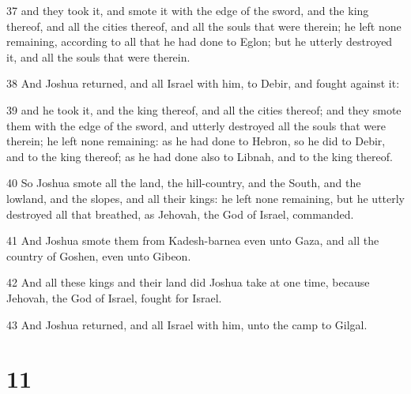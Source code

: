 \par 37 and they took it, and smote it with the edge of the sword, and the king thereof, and all the cities thereof, and all the souls that were therein; he left none remaining, according to all that he had done to Eglon; but he utterly destroyed it, and all the souls that were therein.
\par 38 And Joshua returned, and all Israel with him, to Debir, and fought against it:
\par 39 and he took it, and the king thereof, and all the cities thereof; and they smote them with the edge of the sword, and utterly destroyed all the souls that were therein; he left none remaining: as he had done to Hebron, so he did to Debir, and to the king thereof; as he had done also to Libnah, and to the king thereof.
\par 40 So Joshua smote all the land, the hill-country, and the South, and the lowland, and the slopes, and all their kings: he left none remaining, but he utterly destroyed all that breathed, as Jehovah, the God of Israel, commanded.
\par 41 And Joshua smote them from Kadesh-barnea even unto Gaza, and all the country of Goshen, even unto Gibeon.
\par 42 And all these kings and their land did Joshua take at one time, because Jehovah, the God of Israel, fought for Israel.
\par 43 And Joshua returned, and all Israel with him, unto the camp to Gilgal.

\chapter{11}

